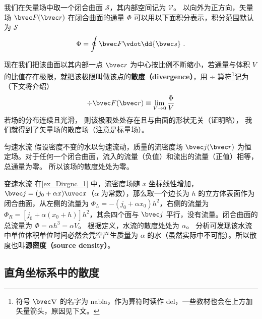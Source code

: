 

我们在矢量场中取一个闭合曲面 $\mathcal{S}$，其内部空间记为 $\mathcal{V}$。 以向外为正方向，矢量场 $\bvec F(\bvec r)$ 在闭合曲面的通量 $\Phi$ 可以用以下面积分表示，积分范围默认为 $\mathcal{S}$
\begin{equation}\label{eq_Divgnc_1}
\Phi  = \oint \bvec F \vdot \dd{\bvec s}~.
\end{equation}

现在我们把该曲面以其内部一点 $\bvec r$ 为中心按比例不断缩小，若通量与体积 $V$ 的比值存在极限，就把该极限叫做该点的\textbf{散度（divergence）}，用 $\div$ 算符\footnote{符号 $\bvec\nabla$ 的名字为 nabla，作为算符时读作 del，一些教材也会在上方加矢量箭头，原因见下文。}记为（下文将介绍）
\begin{equation}\label{eq_Divgnc_2}
\div \bvec F(\bvec r) \equiv \lim_{V \to 0} \frac{\Phi }{V}
\end{equation}
若场的分布连续且光滑， 则该极限处处存在且与曲面的形状无关（证明略）， 我们就得到了矢量场的散度场（注意是标量场）。

\begin{example}{匀速水流}\label{ex_Divgnc_1}
假设密度不变的水以匀速流动，质量的流密度场 $\bvec j(\bvec r)$ 为恒定场。对于任何一个闭合曲面，流入的流量（负值）和流出的流量（正值）相等，总通量为零。 所以该场的散度处处为零。
\end{example}

\begin{example}{变速水流}
在\autoref{ex_Divgnc_1} 中，流密度场随 $x$ 坐标线性增加， $\bvec j = (j_0 + \alpha x)\uvec x$（$\alpha$ 为常数），那么取一个边长为 $h$ 的立方体表面作为闭合曲面，从左侧的流量为 $\Phi_L =  - (j_0 + \alpha x_0) h^2$，右侧的流量为 $\Phi_R = [j_0 + \alpha (x_0 + h)] h^2$，其余四个面与 $\bvec j$ 平行，没有流量。闭合曲面的总流量为 $\Phi  = \alpha h^3 = \alpha V$。 根据定义，水流的散度处处为 $\alpha$。 分析可发现该水流中单位体积单位时间必然会凭空产生质量为 $\alpha$ 的水（虽然实际中不可能）。所以散度也叫\textbf{源密度（source density）}。
\end{example}

\subsection{直角坐标系中的散度}

